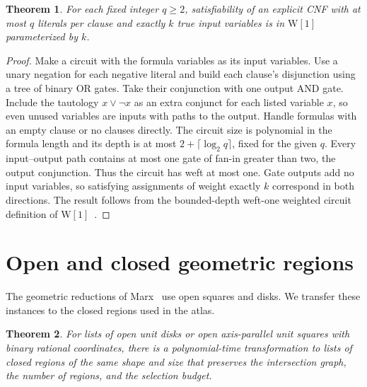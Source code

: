 \documentclass[11pt]{article}
\newtheorem{theorem}{Theorem}
\begin{document}
\hypertarget{weighted-q-cnf-w1-membership}{}
\begin{theorem}
For each fixed integer \(q\ge2\), satisfiability of an explicit CNF
with at most \(q\) literals per clause and exactly \(k\) true input
variables is in \(\mathrm{W}[1]\) parameterized by \(k\).
\end{theorem}

\begin{proof}
Make a circuit with the formula variables as its input variables.
Use a unary negation for each negative literal and build each clause's
disjunction using a tree of binary OR gates. Take their conjunction
with one output AND gate. Include the tautology \(x\lor\neg x\) as an
extra conjunct for each listed variable \(x\), so even unused variables
are inputs with paths to the output. Handle formulas with an empty
clause or no clauses directly. The circuit size is polynomial in the formula length
and its depth is at most \(2+\lceil\log_2 q\rceil\), fixed for the
given \(q\). Every input--output path contains at most one gate
of fan-in greater than two, the output conjunction. Thus the circuit has
weft at most one. Gate outputs add no input variables, so satisfying
assignments of weight exactly \(k\) correspond in both directions.
The result follows from the bounded-depth weft-one weighted circuit
definition of \(\mathrm{W}[1]\)~\cite[Definition 13.16]{book}.
\end{proof}

\section{Open and closed geometric regions}

The geometric reductions of Marx~\cite[Theorems 1 and 3]{marx}
use open squares and disks. We transfer these instances to the closed
regions used in the atlas.

\hypertarget{open-to-closed-regions}{}
\begin{theorem}
For lists of open unit disks or open axis-parallel unit squares with
binary rational coordinates, there is a polynomial-time transformation
to lists of closed regions of the same shape and size that preserves
the intersection graph, the number of regions, and the selection budget.
\end{theorem}
\end{document}

